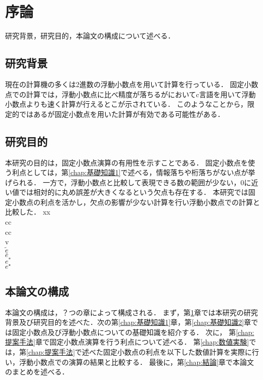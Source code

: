 \chapter{序論}
\label{chap:序論}
研究背景，研究目的，本論文の構成について述べる．
\begin{comment}
    目標規定：
    この修士論文は，固定小数点演算が浮動小数点演算に比べ精度の高い計算を行える場合があることを示すために書く．
\end{comment}
\section{研究背景}
\begin{comment}
    研究テーマにおける既存の知見は何か？
    分かっていないこと、究明すべきことは何か？
    その不足点を究明する意義は何か？
    自分の研究の論拠や仮説は何か？
\end{comment}
現在の計算機の多くは2進数の浮動小数点を用いて計算を行っている．
固定小数点での計算では，浮動小数点に比べ精度が落ちるが\cite{IJERTV12IS010134}においてc言語を用いて浮動小数点よりも速く計算が行えるとこが示されている．
このようなことから，限定的ではあるが固定小数点を用いた計算が有効である可能性がある．

\section{研究目的}
本研究の目的は，固定小数点演算の有用性を示すことである．
固定小数点を使う利点としては，第\ref{chap:基礎知識1}で述べる，情報落ちや桁落ちがない点が挙げられる．
一方で，浮動小数点と比較して表現できる数の範囲が少ない，$0$に近い値では相対的に丸め誤差が大きくなるという欠点も存在する．
本研究では固定小数点の利点を活かし，欠点の影響が少ない計算を行い浮動小数点での計算と比較した．
xx\\
cc \\
cc\\
v\\
$\tilde{e} $\\
$\bar{e}$\\
$e^{\ast}$\\
$e^{\star}$\\
\section{本論文の構成}
本論文の構成は，？つの章によって構成される．
まず，第\ref{chap:序論}章では本研究の研究背景及び研究目的を述べた．次の第\ref{chap:基礎知識1}章，第\ref{chap:基礎知識2}章では固定小数点及び浮動小数点についての基礎知識を紹介する．
次に， 第\ref{chap:提案手法}章で固定小数点演算を行う利点について述べる．
第\ref{chap:数値実験}では，第\ref{chap:提案手法}で述べた固定小数点の利点を以下した数値計算を実際に行い，浮動小数点での演算の結果と比較する．
最後に，第\ref{chap:結論}章で本論文のまとめを述べる．
